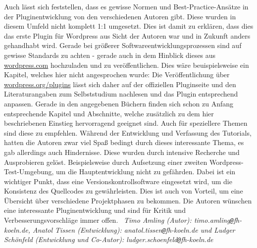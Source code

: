 Auch lässt sich feststellen, dass es gewisse Normen und Best-Practice-Ansätze in der Pluginentwicklung von den verschiedenen Autoren gibt. Diese wurden in diesem Umfeld nicht komplett 1:1 umgesetzt. Dies ist damit zu erklären, dass dies das erste Plugin für Wordpress aus Sicht der Autoren war und in Zukunft anders gehandhabt wird.\newline
Gerade bei größerer Softwareentwicklungsprozessen sind auf gewisse Standards zu achten - gerade auch in dem Hinblick dieses aus \url{wordpress.com} hochzuladen und zu veröffentlichen. \newline
Dies wäre beuispielsweise ein Kapitel, welches hier nicht angesprochen wurde: Die Veröffentlichung über \url{wordpress.org/plugins} lässt sich daher auf der offiziellen Pluginseite und den Literaturangaben zum Selbststudium nachlesen und das Plugin entsprechend anpassen. 
Gerade in den angegebenen Büchern finden sich schon zu Anfang entsprechende Kapitel und Abschnitte, welche zusätzlich zu dem hier beschriebenen Einstieg hervorragend geeignet sind. Auch für speziellere Themen sind diese zu empfehlen.\newline
Während der Entwicklung und Verfassung des Tutorials, hatten die Autoren zwar viel Spaß bedingt durch dieses interessante Thema, es gab allerdings auch Hindernisse. Diese wurden durch intensive Recherche und Ausprobieren gelöst. Beispielsweise durch Aufsetzung einer zweiten Wordpress-Test-Umgebung, um die Hauptentwicklung nicht zu gefährden.\newline
Dabei ist ein wichtiger Punkt, dass eine Versionskontrollsoftware eingesetzt wird, um die Konsistenz des Quellcodes zu gewährleisten. Dies ist auch von Vorteil, um eine Übersicht über verschiedene Projektphasen zu bekommen.\newline
Die Autoren wünschen eine interessante Pluginentwicklung und sind für Kritik und Verbesserungsvorschläge immer offen.\newline\ \newline
\emph{Timo Amling (Autor): timo.amling\texttt{@}fh-koeln.de, \newline Anatol Tissen (Entwicklung): anatol.tissen\texttt{@}fh-koeln.de und \newline Ludger Schönfeld (Entwicklung und Co-Autor): ludger.schoenfeld\texttt{@}fh-koeln.de}
